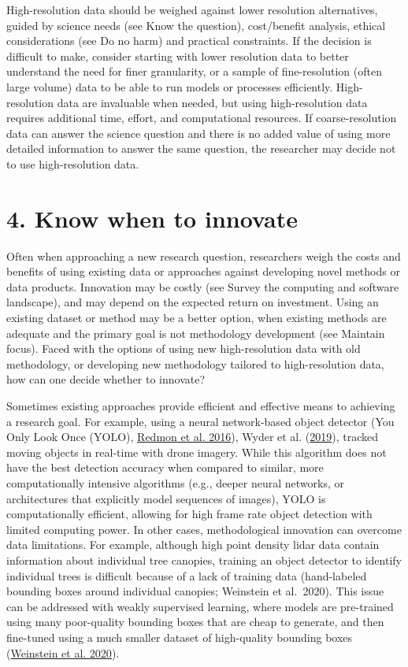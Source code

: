 \documentclass[
  12pt,
]{article}
\begin{document}
High-resolution data should be weighed against lower resolution
alternatives, guided by science needs (see Know the question),
cost/benefit analysis, ethical considerations (see Do no harm) and
practical constraints. If the decision is difficult to make, consider
starting with lower resolution data to better understand the need for
finer granularity, or a sample of fine-resolution (often large volume)
data to be able to run models or processes efficiently. High-resolution
data are invaluable when needed, but using high-resolution data requires
additional time, effort, and computational resources. If
coarse-resolution data can answer the science question and there is no
added value of using more detailed information to answer the same
question, the researcher may decide not to use high-resolution data.

\hypertarget{know-when-to-innovate}{%
\section{4. Know when to innovate}\label{know-when-to-innovate}}

Often when approaching a new research question, researchers weigh the
costs and benefits of using existing data or approaches against
developing novel methods or data products. Innovation may be costly (see
Survey the computing and software landscape), and may depend on the
expected return on investment. Using an existing dataset or method may
be a better option, when existing methods are adequate and the primary
goal is not methodology development (see Maintain focus). Faced with the
options of using new high-resolution data with old methodology, or
developing new methodology tailored to high-resolution data, how can one
decide whether to innovate?

Sometimes existing approaches provide efficient and effective means to
achieving a research goal. For example, using a neural network-based
object detector (You Only Look Once (YOLO),
\protect\hyperlink{ref-redmon2016you}{Redmon et al. 2016}), Wyder et al.
(\protect\hyperlink{ref-wyder2019autonomous}{2019}), tracked moving
objects in real-time with drone imagery. While this algorithm does not
have the best detection accuracy when compared to similar, more
computationally intensive algorithms (e.g., deeper neural networks, or
architectures that explicitly model sequences of images), YOLO is
computationally efficient, allowing for high frame rate object detection
with limited computing power. In other cases, methodological innovation
can overcome data limitations. For example, although high point density
lidar data contain information about individual tree canopies, training
an object detector to identify individual trees is difficult because of
a lack of training data (hand-labeled bounding boxes around individual
canopies; Weinstein et al.~2020). This issue can be addressed with
weakly supervised learning, where models are pre-trained using many
poor-quality bounding boxes that are cheap to generate, and then
fine-tuned using a much smaller dataset of high-quality bounding boxes
(\protect\hyperlink{ref-weinstein2020cross}{Weinstein et al. 2020}).
\end{document}
